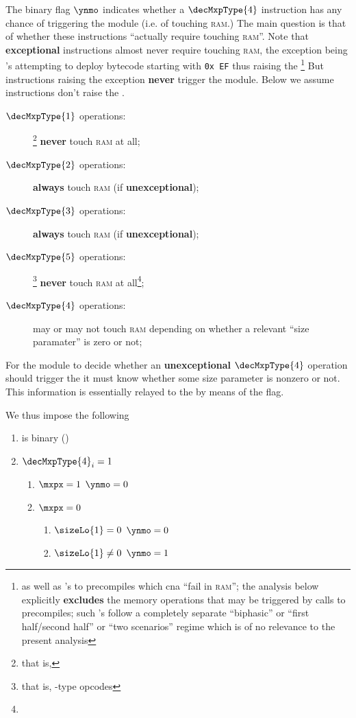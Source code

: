 The binary flag $\ynmo$ indicates whether a $\decMxpType{4}$ instruction has any chance of triggering the \mmuMod{} module (i.e. of touching \textsc{ram}.)
The main question is that of whether these instructions ``actually require touching \textsc{ram}''.
Note that \textbf{exceptional} instructions almost never require touching \textsc{ram}, the exception being 's attempting to deploy bytecode starting with \texttt{0x\,EF} thus raising the \icpxSH{}\footnote{as well as 's to precompiles which cna ``fail in \textsc{ram}''; the analysis below explicitly \textbf{excludes} the memory operations that may be triggered by calls to precompiles; such 's follow a completely separate ``biphasic'' or ``first half/second half'' or ``two scenarios'' regime which is of no relevance to the present analysis}
But instructions raising the \mxpxSH{} exception \textbf{never} trigger the \mmuMod{} module.
Below we assume instructions don't raise the \mxpxSH{}.
\begin{description}
    \item[$\decMxpType{1}$ operations:]\footnote{that is, }
        \textbf{never} touch \textsc{ram} at all;
    \item[$\decMxpType{2}$ operations:]
        \textbf{always} touch \textsc{ram} (if \textbf{unexceptional});
    \item[$\decMxpType{3}$ operations:]
        \textbf{always} touch \textsc{ram} (if \textbf{unexceptional});
    \item[$\decMxpType{5}$ operations:]\footnote{that is, -type opcodes}
        \textbf{never} touch \textsc{ram} at all\footnote{};
    \item[$\decMxpType{4}$ operations:] may or may not touch \textsc{ram} depending on whether a relevant ``size paramater'' is zero or not;
\end{description}
For the \hubMod{} module to decide whether an \textbf{unexceptional} $\decMxpType{4}$ operation should trigger the \mmuMod{} it must know whether some size parameter is nonzero or not.
This information is essentially relayed to the \hubMod{} by means of the \ynmo{} flag.

We thus impose the following
\begin{enumerate}
    \item \ynmo{} is binary \quad (\trash)
    \item \If $\decMxpType{4}_{i} = 1$ \Then
          \begin{enumerate}
              \item \If $\mxpx = 1$ \Then $\ynmo = 0$
              \item \If $\mxpx = 0$ \Then
                    \begin{enumerate}
                        \item  \If $\sizeLo{1} =    0$ \Then $\ynmo = 0$
                        \item  \If $\sizeLo{1} \neq 0$ \Then $\ynmo = 1$
                    \end{enumerate}
          \end{enumerate}
\end{enumerate}
